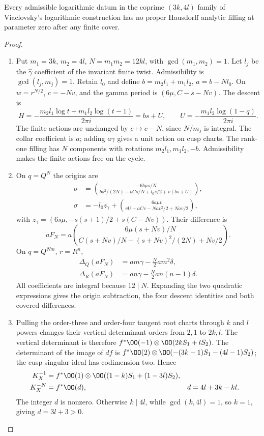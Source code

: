 \begin{theorem}\hypertarget{tag-02RJ}{}\label{night:P2.9}\label{stmt:P2.9}

Every admissible logarithmic datum in the coprime $(3k,4l)$ family of Viaclovsky's logarithmic construction has no proper Hausdorff analytic filling at parameter zero after any finite cover.
\end{theorem}
\begin{proof}
\begin{enumerate}[label=\arabic*.,leftmargin=*]
\item Put $m_1=3k$, $m_2=4l$, $N=m_1m_2=12kl$, with $\gcd(m_1,m_2)=1$. Let $l_j$ be the $\widehat\gamma$ coefficient of the invariant finite twist. Admissibility is $\gcd(l_j,m_j)=1$. Retain $l_0$ and define $b=m_2l_1+m_1l_2$, $a=b-Nl_0$. On $w=r^{N/2}$, $c=-Nv$, and the gamma period is $(6\mu,C-s-Nv)$. The descent is
\[
 H=-\frac{m_2l_1\log t+m_1l_2\log(t-1)}{2\pi i}=bs+U,
 \qquad U=-\frac{m_1l_2\log(1-q)}{2\pi i}.
\]
The finite actions are unchanged by $c\mapsto c-N$, since $N/m_j$ is integral. The collar coefficient is $a$; adding $a\gamma$ gives a unit action on cusp charts. The rank-one filling has $N$ components with rotations $m_2l_1,m_1l_2,-b$. Admissibility makes the finite actions free on the cycle.

\item On $q=Q^N$ the origins are
\begin{align*}
 o&=\binom{-6b\mu s/N}{bs^2/(2N)-bCs/N+l_0s/2+v(bs+U)},\\
 \sigma&=-l_0z_\gamma+\binom{6a\mu v}{vU+aCv-Nav^2/2+Nav/2},
\end{align*}
with $z_\gamma=(6s\mu,-s(s+1)/2+s(C-Nv))$. Their difference is
\[
 aF_N=a\binom{6\mu(s+Nv)/N}{C(s+Nv)/N-(s+Nv)^2/(2N)+Nv/2}.
\]
On $q=Q^{Nm}$, $r=R^n$,
\begin{align*}
 \Delta_Q(aF_N)&=am\gamma-\tfrac N2am^2\delta,\\
 \Delta_R(aF_N)&=an\gamma-\tfrac N2an(n-1)\delta.
\end{align*}
All coefficients are integral because $12\mid N$. Expanding the two quadratic expressions gives the origin subtraction, the four descent identities and both covered differences.

\item Pulling the order-three and order-four tangent root charts through $k$ and $l$ powers changes their vertical determinant orders from $2,1$ to $2k,l$. The vertical determinant is therefore $f^*\OO(-1)\otimes\OO(2kS_1+lS_2)$. The determinant of the image of $df$ is $f^*\OO(2)\otimes\OO(-(3k-1)S_1-(4l-1)S_2)$; the cusp singular ideal has codimension two. Hence
\begin{align*}
 K_X^{-1}&=f^*\OO(1)\otimes\OO((1-k)S_1+(1-3l)S_2),\\
 K_X^{-N}&=f^*\OO(d),& d&=4l+3k-kl.
\end{align*}
The integer $d$ is nonzero. Otherwise $k\mid4l$, while $\gcd(k,4l)=1$, so $k=1$, giving $d=3l+3>0$.


\end{enumerate}
\end{proof}
